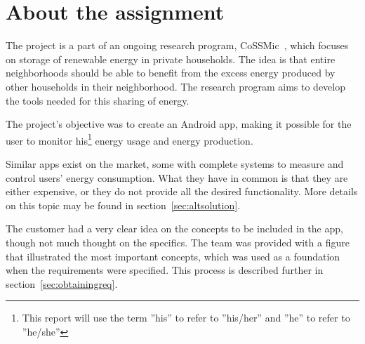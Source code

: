 \section{About the assignment}

The project is a part of an ongoing research program, CoSSMic~\cite{cossmic}, which focuses on storage of renewable energy in private households. 
The idea is that entire neighborhoods should be able to benefit from the excess energy produced by other households in their neighborhood. 
The research program aims to develop the tools needed for this sharing of energy. 

The project's objective was to create an Android \gls{app}, making it possible for the user to monitor his\footnote{This report will use the term ''his'' to refer to ''his/her'' and ''he'' to refer to ''he/she''} 
energy usage and energy production. 

Similar apps exist on the market, some with complete systems to measure and control users' energy consumption. 
What they have in common is that they are either expensive, or they do not provide all the desired functionality. More details on this topic may be found in section~\ref{sec:altsolution}.

The customer had a very clear idea on the concepts to be included in the app, though not much thought on the specifics. The team was provided with a figure that illustrated the most important concepts, which was used as a foundation when the requirements were specified. 
This process is described further in section~\ref{sec:obtainingreq}.